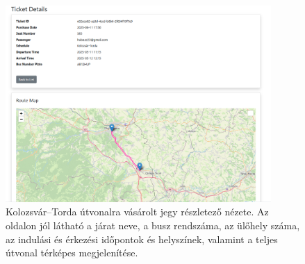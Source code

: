 \begin{figure}[H]
    \centering
    \includegraphics[width=0.9\textwidth]{Szakdolgozat/Mellekletek/ticketdetail.PNG}
    \caption{Kolozsvár–Torda útvonalra vásárolt jegy részletező nézete. Az oldalon jól látható a járat neve, a busz rendszáma, az ülőhely száma, az indulási és érkezési időpontok és helyszínek, valamint a teljes útvonal térképes megjelenítése.}
    \label{fig:ticket-detail-kolozsvar-torda}
\end{figure}


